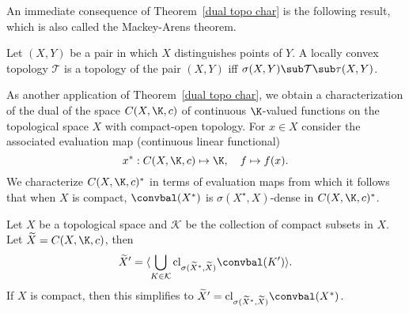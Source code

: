 An immediate consequence of Theorem~\ref{dual topo char} is the following result, which is also called the Mackey-Arens theorem.
\begin{theorem}
Let $(X,Y)$ be a pair in which $X$ distinguishes points of $Y$. A locally convex topology $\mathcal{T}$ is a topology of the pair $(X,Y)$ iff $\sigma(X,Y)\sub\mathcal{T}\sub\tau(X,Y)$.
\end{theorem}
As another application of Theorem~\ref{dual topo char}, we obtain a characterization of the dual of the space $C(X,\K,c)$ of continuous $\K$-valued functions on the topological space $X$ with compact-open topology. For $x\in X$ consider the associated evaluation map (continuous linear functional)
\[x^*:C(X,\K,c)\mapsto\K,\quad f\mapsto f(x).\]
We characterize $C(X,\K,c)^*$ in terms of evaluation maps from which it follows that when $X$ is compact, $\convbal(X^*)$ is $\sigma(X^{\star},X)$-dense in $C(X,\K,c)^*$.
\begin{proposition}\label{dual of C(X,K,c)}
Let $X$ be a topological space and $\mathcal{K}$ be the collection of compact subsets in $X$. Let $\widetilde{X}=C(X,\K,c)$, then
\[\widetilde{X}'=\langle\bigcup_{K\in\mathcal{K}}\mathrm{cl}_{\sigma(\widetilde{X}^*,\widetilde{X})}\convbal(K')\rangle.\]
If $X$ is compact, then this simplifies to $\widetilde{X}'=\mathrm{cl}_{\sigma(\widetilde{X}^*,\widetilde{X})}\convbal(X^*)$.
\end{proposition}

